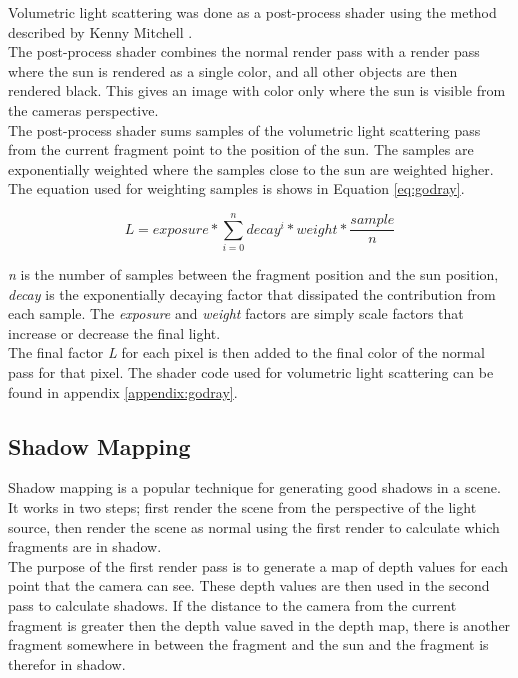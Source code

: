 \documentclass{article}
\begin{document}
  			Volumetric light scattering was done as a post-process shader using the method described by Kenny Mitchell \citep{mitchell}. \\
  			
  			The post-process shader combines the normal render pass with a render pass where the sun is rendered as a single color, and all other objects are then rendered black. This gives an image with color only where the sun is visible from the cameras perspective. \\
  			
  			The post-process shader sums samples of the volumetric light scattering pass from the current fragment point to the position of the sun. The samples are exponentially weighted where the samples close to the sun are weighted higher. The equation used for weighting samples is shows in Equation \ref{eq:godray}. 
  			
  			\begin{equation}
  				\label{eq:godray}
  				L = exposure * \sum_{i = 0}^{n} decay^i * weight * \frac{sample}{n}
  			\end{equation}
  			
  			\textit{n} is the number of samples between the fragment position and the sun position, \textit{decay} is the exponentially decaying factor that dissipated the contribution from each sample. The \textit{exposure} and \textit{weight} factors are simply scale factors that increase or decrease the final light. \\
  			
  			The final factor \textit{L} for each pixel is then added to the final color of the normal pass for that pixel. The shader code used for volumetric light scattering can be found in appendix \ref{appendix:godray}.
  		
  		\subsection{Shadow Mapping}
  			Shadow mapping is a popular technique for generating good shadows in a scene. It works in two steps; first render the scene from the perspective of the light source, then render the scene as normal using the first render to calculate which fragments are in shadow. \citep{ragnemalm2015so} \\
  			
  			The purpose of the first render pass is to generate a map of depth values for each point that the camera can see. These depth values are then used in the second pass to calculate shadows. If the distance to the camera from the current fragment is greater then the depth value saved in the depth map, there is another fragment somewhere in between the fragment and the sun and the fragment is therefor in shadow. \citep{ragnemalm2015so}
  			
\end{document}
